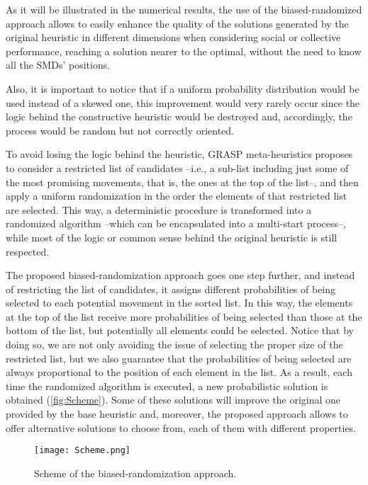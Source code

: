 \documentclass[twoside,openright]{report}
\begin{document}
As it will be illustrated in the numerical results, the use of the biased-randomized approach allows to easily enhance the quality of the solutions generated by the original heuristic in different dimensions when considering social or collective performance, reaching a solution nearer to the optimal, without the need to know all the \glspl{SMD}' positions. 

Also, it is important to notice that if a uniform probability distribution would be used instead of a skewed one, this improvement would very rarely occur since the logic behind the constructive heuristic would be destroyed and, accordingly, the process would be random but not correctly oriented.

To avoid losing the logic behind the heuristic, GRASP meta-heuristics \cite{Feo1995} proposes to consider a restricted list of candidates --i.e., a sub-list including just some of the most promising movements, that is, the ones at the top of the list--, and then apply a uniform randomization in the order the elements of that restricted list are selected.
This way, a deterministic procedure is transformed into a randomized algorithm --which can be encapsulated into a multi-start process--, while most of the logic or common sense behind the original heuristic is still respected.

The proposed biased-randomization approach goes one step further, and instead of restricting the list of candidates, it assigns different probabilities of being selected to each potential movement in the sorted list. 
In this way, the elements at the top of the list receive more probabilities of being selected than those at the bottom of the list, but potentially all elements could be selected. 
Notice that by doing so, we are not only avoiding the issue of selecting the proper size of the restricted list, but we also guarantee that the probabilities of being selected are always proportional to the position of each element in the list.
As a result, each time the randomized algorithm is executed, a new probabilistic solution is obtained (\autoref{fig:Scheme}). 
Some of these solutions will improve the original one provided by the base heuristic and, moreover, the proposed approach allows to offer alternative solutions to choose from, each of them with different properties.
\begin{figure}[tbp]
\centering
\texttt{[image: Scheme.png]}
\caption{Scheme of the biased-randomization approach.}
\label{fig:Scheme}
\end{figure}
\end{document}
